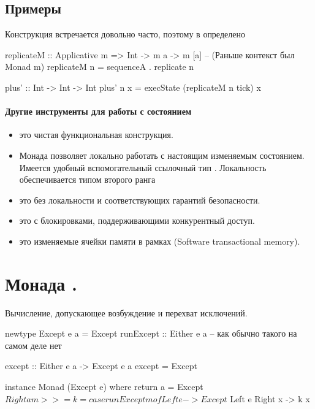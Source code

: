 \documentclass[11pt,a4paper]{article}
\begin{document}
\subsection{Примеры}
Конструкция  встречается довольно часто, поэтому в  определено
\begin{hscode}
replicateM :: Applicative m => Int -> m a -> m [a] -- (Раньше контекст был Monad m)
replicateM n = sequenceA . replicate n 

plus' :: Int -> Int -> Int
plus' n x = execState (replicateM n tick) x
\end{hscode}

\paragraph{Другие инструменты для работы с состоянием}
\begin{itemize}
	\item {} это чистая функциональная конструкция.
	\item Монада  позволяет локально работать с настоящим изменяемым состоянием. Имеется удобный вспомогательный ссылочный тип . Локальность обеспечивается типом второго ранга 

	\item {} это  без локальности и соответствующих гарантий безопасности.
	\item {} это  с блокировками, поддерживающими конкурентный доступ.
	\item {} это изменяемые ячейки памяти в рамках  (Software transactional memory).
\end{itemize}


\section{Монада .}
Вычисление, допускающее возбуждение и перехват
исключений.
\begin{hscode}
newtype Except e a = Except {runExcept :: Either e a}  -- как обычно такого на самом деле нет

except :: Either e a -> Except e a
except = Except

instance Monad (Except e) where
	return a = Except $ Right a
	m >>= k = case runExcept m of
		Left e -> Except $ Left e
		Right x -> k x
\end{hscode}
\end{document}
